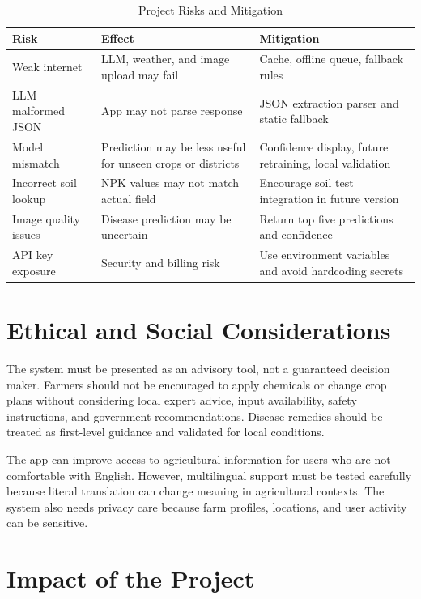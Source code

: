 \documentclass[12pt,a4paper]{report}
\begin{document}
\begin{table}[H]
\centering
\caption{Project Risks and Mitigation}
\label{tab:risks}
\small
\begin{tabular}{p{3.6cm}p{4.6cm}p{4.6cm}}
\toprule
\textbf{Risk} & \textbf{Effect} & \textbf{Mitigation} \\
\midrule
Weak internet & LLM, weather, and image upload may fail & Cache, offline queue, fallback rules \\
LLM malformed JSON & App may not parse response & JSON extraction parser and static fallback \\
Model mismatch & Prediction may be less useful for unseen crops or districts & Confidence display, future retraining, local validation \\
Incorrect soil lookup & NPK values may not match actual field & Encourage soil test integration in future version \\
Image quality issues & Disease prediction may be uncertain & Return top five predictions and confidence \\
API key exposure & Security and billing risk & Use environment variables and avoid hardcoding secrets \\
\bottomrule
\end{tabular}
\end{table}

\section{Ethical and Social Considerations}

The system must be presented as an advisory tool, not a guaranteed decision maker. Farmers should not be encouraged to apply chemicals or change crop plans without considering local expert advice, input availability, safety instructions, and government recommendations. Disease remedies should be treated as first-level guidance and validated for local conditions.

The app can improve access to agricultural information for users who are not comfortable with English. However, multilingual support must be tested carefully because literal translation can change meaning in agricultural contexts. The system also needs privacy care because farm profiles, locations, and user activity can be sensitive.

\section{Impact of the Project}
\end{document}
